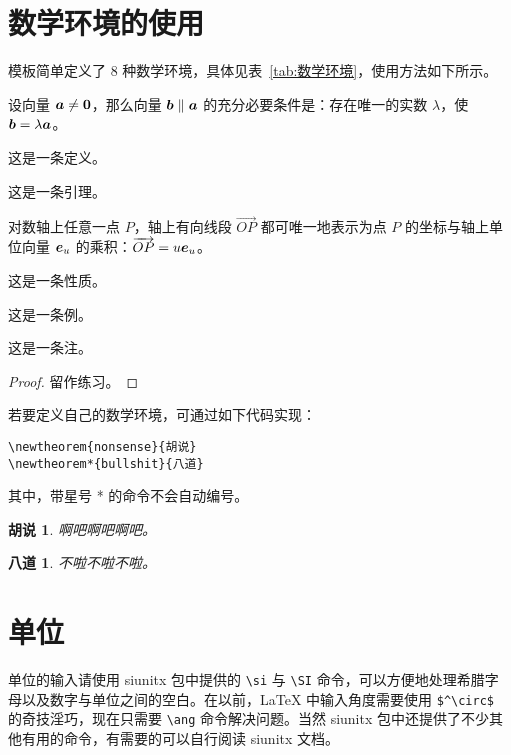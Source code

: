 \section{数学环境的使用}
模板简单定义了 8 种数学环境，具体见表~\ref{tab:数学环境}，使用方法如下所示。

\begin{theorem}
  设向量 \(\vb*{a} \neq \vb*{0}\)，那么向量 \(\vb*{b} \parallel \vb*{a}\) 的充分必要条件是：存在唯一的实数 \(\lambda\)，使 \(\vb*{b} = \lambda \vb*{a}\)。
\end{theorem}
\begin{definition}
  这是一条定义。
\end{definition}
\begin{lemma}
  这是一条引理。
\end{lemma}
\begin{corollary}
  对数轴上任意一点 \(P\)，轴上有向线段 \(\overrightarrow{OP}\) 都可唯一地表示为点 \(P\) 的坐标与轴上单位向量 \(\vb*{e}_u\) 的乘积：\(\overrightarrow{OP} = u \vb*{e}_u\)。
\end{corollary}
\begin{proposition}
  这是一条性质。
\end{proposition}
\begin{example}
  这是一条例。
\end{example}
\begin{remark}
  这是一条注。
\end{remark}
\begin{proof}
  留作练习。
\end{proof}

若要定义自己的数学环境，可通过如下代码实现：
\begin{verbatim}
\newtheorem{nonsense}{胡说}
\newtheorem*{bullshit}{八道}
\end{verbatim}
其中，带星号 * 的命令不会自动编号。

\newtheorem{nonsense}{胡说}
\newtheorem*{bullshit}{八道}

\begin{nonsense}
  啊吧啊吧啊吧。
\end{nonsense}

\begin{bullshit}
  不啦不啦不啦。
\end{bullshit}

\section{单位}
单位的输入请使用 siunitx 包中提供的 \verb|\si| 与 \verb|\SI| 命令，可以方便地处理希腊字母以及数字与单位之间的空白。在以前，\LaTeX{} 中输入角度需要使用 \verb|$^\circ$| 的奇技淫巧，现在只需要 \verb|\ang| 命令解决问题。当然 siunitx 包中还提供了不少其他有用的命令，有需要的可以自行阅读 siunitx 文档。

